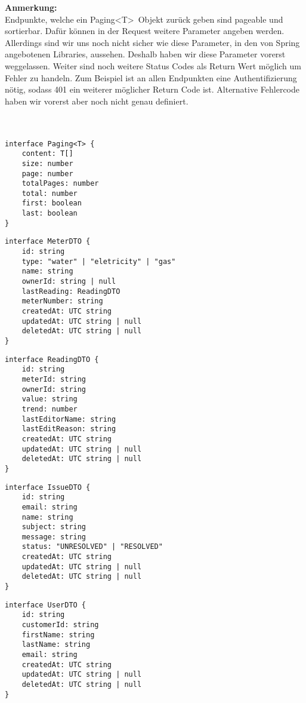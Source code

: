 \textbf{Anmerkung:} \\
Endpunkte, welche ein Paging\textless T\textgreater \  Objekt zurück geben sind pageable und sortierbar. Dafür können in der Request weitere Parameter angeben werden. Allerdings sind wir uns noch nicht sicher wie diese Parameter, in den von Spring angebotenen Libraries, aussehen. Deshalb haben wir diese Parameter vorerst weggelassen. Weiter sind noch weitere Status Codes als Return Wert möglich um Fehler zu handeln. Zum Beispiel ist an allen Endpunkten eine Authentifizierung nötig, sodass 401 ein weiterer möglicher Return Code ist. Alternative Fehlercode haben wir vorerst aber noch nicht genau definiert.  \\ \\ \\
 

\begin{lstlisting}
interface Paging<T> {
	content: T[]
	size: number
	page: number
	totalPages: number
	total: number
	first: boolean
	last: boolean
}
\end{lstlisting}


\begin{lstlisting}
interface MeterDTO {
	id: string
	type: "water" | "eletricity" | "gas"
	name: string
	ownerId: string | null
	lastReading: ReadingDTO
	meterNumber: string
	createdAt: UTC string
	updatedAt: UTC string | null
	deletedAt: UTC string | null
}
\end{lstlisting} \newpage

\begin{lstlisting}
interface ReadingDTO {
	id: string
	meterId: string
	ownerId: string
	value: string
	trend: number
	lastEditorName: string
	lastEditReason: string
	createdAt: UTC string
	updatedAt: UTC string | null
	deletedAt: UTC string | null
}
\end{lstlisting}

\begin{lstlisting}
interface IssueDTO {
	id: string
	email: string
	name: string
	subject: string
	message: string
	status: "UNRESOLVED" | "RESOLVED"
	createdAt: UTC string
	updatedAt: UTC string | null
	deletedAt: UTC string | null
}
\end{lstlisting}


\begin{lstlisting}
interface UserDTO {
	id: string
	customerId: string
	firstName: string
	lastName: string
	email: string
	createdAt: UTC string
	updatedAt: UTC string | null
	deletedAt: UTC string | null
}
\end{lstlisting}

